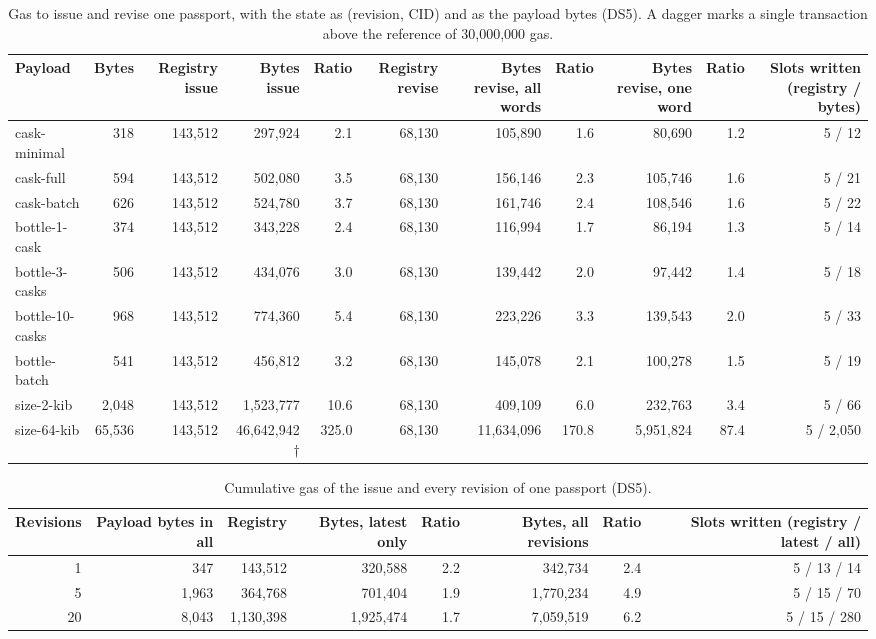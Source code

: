 \begin{table}[htbp]
    \centering
    \small
    \begin{tabular}{lrrrrrrrrrr}
    \toprule
    Payload & Bytes & Registry issue & Bytes issue & Ratio & Registry revise & Bytes revise, all words & Ratio & Bytes revise, one word & Ratio & Slots written (registry / bytes) \\
    \midrule
    cask-minimal & 318 & 143,512 & 297,924 & 2.1 & 68,130 & 105,890 & 1.6 & 80,690 & 1.2 & 5 / 12 \\
    cask-full & 594 & 143,512 & 502,080 & 3.5 & 68,130 & 156,146 & 2.3 & 105,746 & 1.6 & 5 / 21 \\
    cask-batch & 626 & 143,512 & 524,780 & 3.7 & 68,130 & 161,746 & 2.4 & 108,546 & 1.6 & 5 / 22 \\
    bottle-1-cask & 374 & 143,512 & 343,228 & 2.4 & 68,130 & 116,994 & 1.7 & 86,194 & 1.3 & 5 / 14 \\
    bottle-3-casks & 506 & 143,512 & 434,076 & 3.0 & 68,130 & 139,442 & 2.0 & 97,442 & 1.4 & 5 / 18 \\
    bottle-10-casks & 968 & 143,512 & 774,360 & 5.4 & 68,130 & 223,226 & 3.3 & 139,543 & 2.0 & 5 / 33 \\
    bottle-batch & 541 & 143,512 & 456,812 & 3.2 & 68,130 & 145,078 & 2.1 & 100,278 & 1.5 & 5 / 19 \\
    size-2-kib & 2,048 & 143,512 & 1,523,777 & 10.6 & 68,130 & 409,109 & 6.0 & 232,763 & 3.4 & 5 / 66 \\
    size-64-kib & 65,536 & 143,512 & 46,642,942 † & 325.0 & 68,130 & 11,634,096 & 170.8 & 5,951,824 & 87.4 & 5 / 2,050 \\
    \bottomrule
    \end{tabular}
    \caption{Gas to issue and revise one passport, with the state as (revision, CID) and as the payload bytes (DS5). A dagger marks a single transaction above the reference of 30,000,000 gas.}
    \label{tab:storage-single}
\end{table}

\begin{table}[htbp]
    \centering
    \small
    \begin{tabular}{rrrrrrrr}
    \toprule
    Revisions & Payload bytes in all & Registry & Bytes, latest only & Ratio & Bytes, all revisions & Ratio & Slots written (registry / latest / all) \\
    \midrule
    1 & 347 & 143,512 & 320,588 & 2.2 & 342,734 & 2.4 & 5 / 13 / 14 \\
    5 & 1,963 & 364,768 & 701,404 & 1.9 & 1,770,234 & 4.9 & 5 / 15 / 70 \\
    20 & 8,043 & 1,130,398 & 1,925,474 & 1.7 & 7,059,519 & 6.2 & 5 / 15 / 280 \\
    \bottomrule
    \end{tabular}
    \caption{Cumulative gas of the issue and every revision of one passport (DS5).}
    \label{tab:storage-growth}
\end{table}
